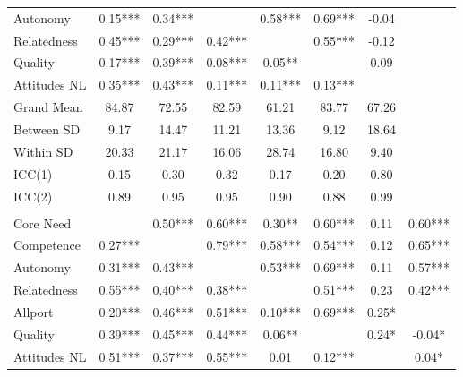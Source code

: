 \begin{table}
\begin{minipage}[t][\textheight][t]{\textwidth}
{\begin{tabular}[t]{lccccccc}
\hspace{1em}Autonomy & 0.15*** & 0.34*** &  & 0.58*** & 0.69*** & -0.04 & \\
\hspace{1em}Relatedness & 0.45*** & 0.29*** & 0.42*** &  & 0.55*** & -0.12 & \\
\hspace{1em}Quality & 0.17*** & 0.39*** & 0.08*** & 0.05** &  & 0.09 & \\
\hspace{1em}Attitudes NL & 0.35*** & 0.43*** & 0.11*** & 0.11*** & 0.13*** &  & \\
\addlinespace
\hspace{1em}Grand Mean & 84.87 & 72.55 & 82.59 & 61.21 & 83.77 & 67.26 & \\
\hspace{1em}Between SD & 9.17 & 14.47 & 11.21 & 13.36 & 9.12 & 18.64 & \\
\hspace{1em}Within SD & 20.33 & 21.17 & 16.06 & 28.74 & 16.80 & 9.40 & \\
\hspace{1em}ICC(1) & 0.15 & 0.30 & 0.32 & 0.17 & 0.20 & 0.80 & \\
\hspace{1em}ICC(2) & 0.89 & 0.95 & 0.95 & 0.90 & 0.88 & 0.99 & \\
\addlinespace[0.3em]
\multicolumn{8}{l}{\textbf{Study 3}}\\
\hspace{1em}Core Need &  & 0.50*** & 0.60*** & 0.30** & 0.60*** & 0.11 & 0.60***\\
\hspace{1em}Competence & 0.27*** &  & 0.79*** & 0.58*** & 0.54*** & 0.12 & 0.65***\\
\hspace{1em}Autonomy & 0.31*** & 0.43*** &  & 0.53*** & 0.69*** & 0.11 & 0.57***\\
\hspace{1em}Relatedness & 0.55*** & 0.40*** & 0.38*** &  & 0.51*** & 0.23 & 0.42***\\
\hspace{1em}Allport & 0.20*** & 0.46*** & 0.51*** & 0.10*** & 0.69*** & 0.25* & \\
\hspace{1em}Quality & 0.39*** & 0.45*** & 0.44*** & 0.06** &  & 0.24* & -0.04*\\
\hspace{1em}Attitudes NL & 0.51*** & 0.37*** & 0.55*** & 0.01 & 0.12*** &  & 0.04*\\

\end{tabular}}
\end{minipage}
\end{table}
